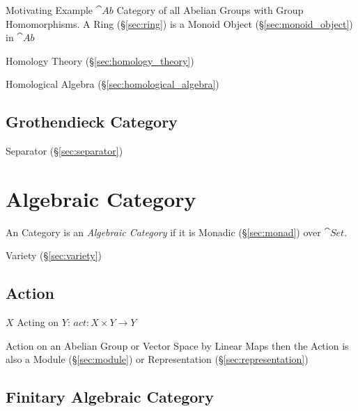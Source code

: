 Motivating Example $\cat{Ab}$ Category of all Abelian Groups with
Group Homomorphisms. A Ring (\S\ref{sec:ring}) is a Monoid Object
(\S\ref{sec:monoid_object}) in $\cat{Ab}$

Homology Theory (\S\ref{sec:homology_theory})

Homological Algebra (\S\ref{sec:homological_algebra})



\subsection{Grothendieck Category}\label{sec:grothendieck_category}

Separator (\S\ref{sec:separator})



\section{Algebraic Category}\label{sec:algebraic_category}

An Category is an \emph{Algebraic Category} if it is Monadic
(\S\ref{sec:monad}) over $\cat{Set}$.

Variety (\S\ref{sec:variety})



\subsection{Action}\label{sec:action}


$X$ Acting on $Y$: $act: X \times Y \rightarrow Y$

Action on an Abelian Group or Vector Space by Linear Maps then the
Action is also a Module (\S\ref{sec:module}) or Representation
(\S\ref{sec:representation})



\subsection{Finitary Algebraic Category}
\label{sec:finitary_algebraic_category}


